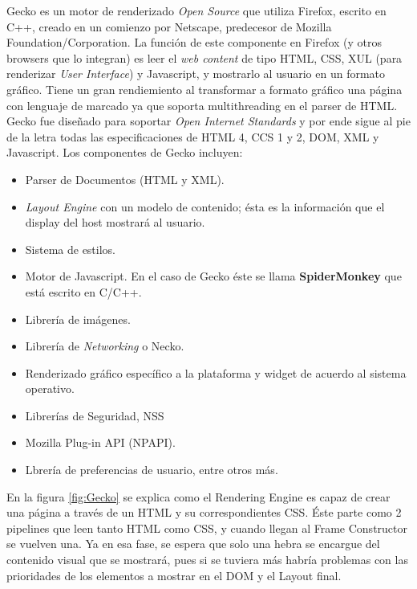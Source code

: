         Gecko es un motor de renderizado \textit{Open Source} que utiliza Firefox, escrito en C++, creado en un comienzo por Netscape, predecesor de Mozilla Foundation/Corporation. La función de este componente en Firefox (y otros browsers que lo integran) es leer el \textit{web content} de tipo HTML, CSS, XUL (para renderizar \textit{User Interface}) y Javascript, y mostrarlo al usuario en un formato gráfico. Tiene un gran rendiemiento al transformar a formato gráfico una página con lenguaje de marcado ya que soporta multithreading en el parser de HTML. Gecko fue diseñado para soportar \textit{Open Internet Standards} y por ende sigue al pie de la letra todas las especificaciones de HTML 4, CCS 1 y 2, DOM, XML y Javascript. Los componentes de Gecko incluyen:
            \begin{itemize}
                \item Parser de Documentos (HTML y XML).
                \item \textit{Layout Engine} con un modelo de contenido; ésta es la información que el display del host mostrará al usuario.
                \item Sistema de estilos.
                \item Motor de Javascript. En el caso de Gecko éste se llama \textbf{SpiderMonkey} que está escrito en C/C++.
                \item Librería de imágenes.
                \item Librería de \textit{Networking} o Necko.
                \item Renderizado gráfico específico a la plataforma y widget de acuerdo al sistema operativo.
                \item Librerías de Seguridad, NSS
                \item Mozilla Plug-in API (NPAPI).
                \item Lbrería de preferencias de usuario, entre otros más.

            \end{itemize}
        En la figura \ref{fig:Gecko} se explica como el Rendering Engine es capaz de crear una página a través de un HTML y su correspondientes CSS. Éste parte como 2 pipelines que leen tanto HTML como CSS, y cuando llegan al Frame Constructor se vuelven una. Ya en esa fase, se espera que solo una hebra se encargue del contenido visual que se mostrará, pues si se tuviera más habría problemas con las prioridades de los elementos a mostrar en el DOM y el Layout final.


